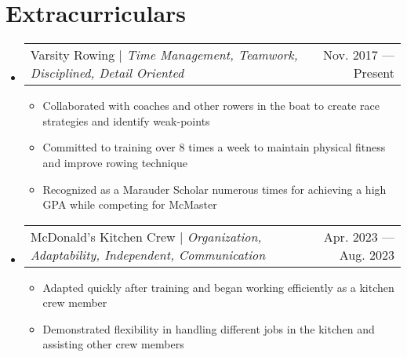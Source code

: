 \documentclass[letterpaper,11pt]{article}
\makeatletter
\newcommand{\resumeItem}[1]{
	\item\small{
		{#1 \vspace{-2pt}}
	}
}
\newcommand{\resumeProjectHeading}[2]{
	\item
	\begin{tabular*}{0.97\textwidth}{l@{\extracolsep{\fill}}r}
		\small#1 & #2 \\
	\end{tabular*}\vspace{-7pt}
}
\newcommand{\resumeSubHeadingListStart}{\begin{itemize}[leftmargin=0.15in,
			label={}]}
\newcommand{\resumeSubHeadingListEnd}{\end{itemize}}
\newcommand{\resumeItemListStart}{\begin{itemize}}
\newcommand{\resumeItemListEnd}{\end{itemize}\vspace{-5pt}}
\makeatother
\begin{document}
\section{Extracurriculars}
\resumeSubHeadingListStart
\resumeProjectHeading{Varsity Rowing $|$ \emph{Time Management, Teamwork, Disciplined, Detail Oriented}}{Nov. 2017 ---
	Present}
\resumeItemListStart
\resumeItem{Collaborated with coaches and other rowers in the boat to create race strategies and identify weak-points}
\resumeItem{Committed to training over 8 times a week to maintain physical fitness and improve rowing technique}
\resumeItem{Recognized as a Marauder Scholar numerous times for achieving a high GPA while competing for McMaster}
\resumeItemListEnd
\resumeProjectHeading{McDonald's Kitchen Crew $|$ \emph{Organization, Adaptability, Independent, Communication}}{Apr. 2023 --- Aug. 2023}
\resumeItemListStart
\resumeItem{Adapted quickly after training and began working efficiently as a kitchen crew member}
\resumeItem{Demonstrated flexibility in handling different jobs in the kitchen and assisting other crew members}
\resumeItemListEnd
\resumeSubHeadingListEnd

\end{document}
